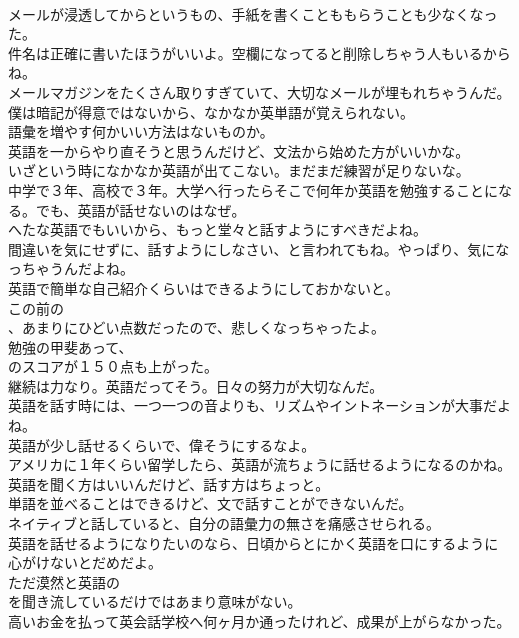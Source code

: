 \documentclass[8pt]{extreport}
\begin{document}
\begin{CJK}{UTF8}{min}
\\	メールが浸透してからというもの、手紙を書くことももらうことも少なくなった。	
\\	件名は正確に書いたほうがいいよ。空欄になってると削除しちゃう人もいるからね。	
\\	メールマガジンをたくさん取りすぎていて、大切なメールが埋もれちゃうんだ。	
\\	僕は暗記が得意ではないから、なかなか英単語が覚えられない。	
\\	語彙を増やす何かいい方法はないものか。	
\\	英語を一からやり直そうと思うんだけど、文法から始めた方がいいかな。	
\\	いざという時になかなか英語が出てこない。まだまだ練習が足りないな。	
\\	中学で３年、高校で３年。大学へ行ったらそこで何年か英語を勉強することになる。でも、英語が話せないのはなぜ。	
\\	へたな英語でもいいから、もっと堂々と話すようにすべきだよね。	
\\	間違いを気にせずに、話すようにしなさい、と言われてもね。やっぱり、気になっちゃうんだよね。	
\\	英語で簡単な自己紹介くらいはできるようにしておかないと。	
\\	この前の
\\	、あまりにひどい点数だったので、悲しくなっちゃったよ。	
\\	勉強の甲斐あって、
\\	のスコアが１５０点も上がった。	
\\	継続は力なり。英語だってそう。日々の努力が大切なんだ。	
\\	英語を話す時には、一つ一つの音よりも、リズムやイントネーションが大事だよね。	
\\	英語が少し話せるくらいで、偉そうにするなよ。	
\\	アメリカに１年くらい留学したら、英語が流ちょうに話せるようになるのかね。	
\\	英語を聞く方はいいんだけど、話す方はちょっと。	
\\	単語を並べることはできるけど、文で話すことができないんだ。	
\\	ネイティブと話していると、自分の語彙力の無さを痛感させられる。	
\\	英語を話せるようになりたいのなら、日頃からとにかく英語を口にするように心がけないとだめだよ。	
\\	ただ漠然と英語の
\\	を聞き流しているだけではあまり意味がない。	
\\	高いお金を払って英会話学校へ何ヶ月か通ったけれど、成果が上がらなかった。	

\end{CJK}
\end{document}
